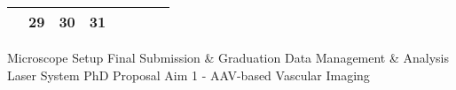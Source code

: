 {\begin{tabularx}{\linewidth}{|l!{\vrule width \myLenLineThicknessThick}*{7}{@{}X@{}|}}
       & 
    
      
      
        \begin{minipage}[t]{6mm}\centering{}29\end{minipage}
      
       & 
    
      
      
        \begin{minipage}[t]{6mm}\centering{}30\end{minipage}
      
       & 
    
      
      
        \begin{minipage}[t]{6mm}\centering{}31\end{minipage}
      
       & 
    
      
      
       & 
    
      
      
      
        \\  \hline 
      
    
  
  
  \end{tabularx}
}
\vfill{\centering{} \small{Microscope Setup}\hspace{ 1.5em } \small{Final Submission \& Graduation}\hspace{ 1.5em } \small{Data Management \& Analysis}\hspace{ 1.5em } \small{Laser System}\hspace{ 1.5em } \small{PhD Proposal}\hspace{ 1.5em } \small{Aim 1 - AAV-based Vascular Imaging}\hspace{ 1.5em }\par}

